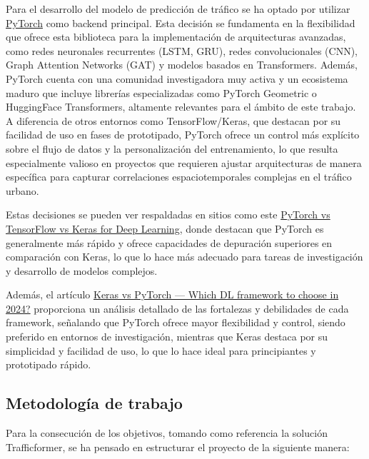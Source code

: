 Para el desarrollo del modelo de predicción de tráfico se ha optado por utilizar \href{https://pytorch.org/}{PyTorch} como backend principal. Esta decisión se fundamenta en la flexibilidad que ofrece esta biblioteca para la implementación de arquitecturas avanzadas, como redes neuronales recurrentes (LSTM, GRU), redes convolucionales (CNN), Graph Attention Networks (GAT) y modelos basados en Transformers. Además, PyTorch cuenta con una comunidad investigadora muy activa y un ecosistema maduro que incluye librerías especializadas como PyTorch Geometric o HuggingFace Transformers, altamente relevantes para el ámbito de este trabajo. A diferencia de otros entornos como TensorFlow/Keras, que destacan por su facilidad de uso en fases de prototipado, PyTorch ofrece un control más explícito sobre el flujo de datos y la personalización del entrenamiento, lo que resulta especialmente valioso en proyectos que requieren ajustar arquitecturas de manera específica para capturar correlaciones espaciotemporales complejas en el tráfico urbano. 

Estas decisiones se pueden ver respaldadas en sitios como este \href{https://www.datacamp.com/tutorial/pytorch-vs-tensorflow-vs-keras}{PyTorch vs TensorFlow vs Keras for Deep Learning}, donde destacan que PyTorch es generalmente más rápido y ofrece capacidades de depuración superiores en comparación con Keras, lo que lo hace más adecuado para tareas de investigación y desarrollo de modelos complejos. 

Además, el artículo \href{https://unfoldai.com/keras-vs-pytorch-in-2024}{Keras vs PyTorch — Which DL framework to choose in 2024?} proporciona un análisis detallado de las fortalezas y debilidades de cada framework, señalando que PyTorch ofrece mayor flexibilidad y control, siendo preferido en entornos de investigación, mientras que Keras destaca por su simplicidad y facilidad de uso, lo que lo hace ideal para principiantes y prototipado rápido.

\subsection{Metodología de trabajo}

Para la consecución de los objetivos, tomando como referencia la solución Trafficformer, se ha pensado en estructurar el proyecto de la siguiente manera:

